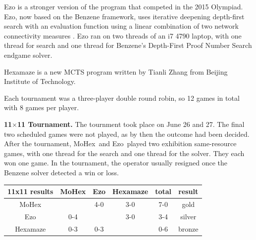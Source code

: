 \documentclass{icga}
\newif\iflong\longfalse  %
\def\Eo{\mbox{\sc Ezo}}
\def\Hz{\mbox{\sc Hexamaze}}
\def\Mx{\mbox{\sc MoHex}}
\begin{document}
\Eo{} is a stronger version of the program that competed in the 2015 Olympiad.
\Eo{}, now based on the Benzene framework, 
uses iterative deepening depth-first search 
with an evaluation function using a linear combination of
two network connectivity measures .
\Eo{} ran on two threads of an i7 4790 laptop,
with one thread for search and one thread for
Benzene's Depth-First Proof Number Search endgame solver.

\Hz{} is a new MCTS program written by Tianli Zhang from 
Beijing Institute of Technology.

Each tournament was a three-player double round robin, so 12 games
in total with 8 games per player.

{\large\bf 11$\times$11 Tournament.}
The tournment took place on June 26 and 27.
The final two scheduled games were not played,
as by then the outcome had been decided.
After the tournament, \Mx\ and \Eo\ played two 
exhibition same-resource games,
with one thread for the search and one
thread for the solver. They each won one game.
In the tournament, the operator usually resigned
once the Benzene solver detected a win or loss.

\hfill\begin{tabular}{|c|c|c|c|c|c|}
\hline 11x11 results &\Mx{} &\Eo{}  & \Hz{}  & total & result \\ 
\hline \Mx{}         &      &  4-0  &  3-0   & 7-0  &  gold \\
\hline \Eo{}         &  0-4 &       &  3-0   & 3-4  &  silver \\
\hline \Hz{}         &  0-3 &  0-3  &        & 0-6  &  bronze \\
\hline
\end{tabular}\hfill~

\iflong
This is the longer version, so we include all games.
\fi
\end{document}
